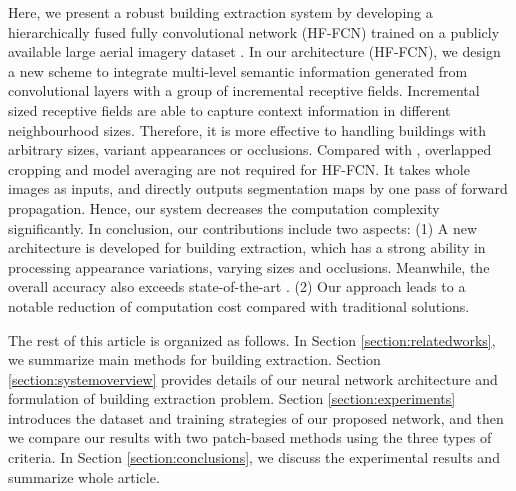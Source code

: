 \documentclass[runningheads]{llncs}
\begin{document}
  Here, we present a robust building extraction system by developing a hierarchically fused fully convolutional network (HF-FCN) trained on a publicly available large aerial imagery dataset \cite{Mnih2013Machine}. In our architecture (HF-FCN), we design a new scheme to integrate multi-level semantic information generated from convolutional layers with a group of incremental receptive fields. Incremental sized receptive fields are able to capture context information in different neighbourhood sizes. Therefore, it is more effective to handling buildings with arbitrary sizes, variant appearances or occlusions. Compared with \cite{Mnih2013Machine,Saito2016Multiple}, overlapped cropping and model averaging are not required for HF-FCN. It takes whole images as inputs, and directly outputs segmentation maps by one pass of forward propagation. Hence, our system decreases the computation complexity significantly. In conclusion, our contributions include two aspects: (1) A new architecture is developed for building extraction, which has a strong ability in processing appearance variations,  varying sizes and occlusions. Meanwhile, the overall accuracy  also exceeds state-of-the-art \cite{Saito2016Multiple}. (2) Our approach leads to a notable reduction of computation cost  compared with traditional solutions.
  
  
   The rest of this article is organized as follows. In Section \ref{section:relatedworks}, we summarize main   methods for building extraction. Section \ref{section:systemoverview} provides details of our neural network architecture and formulation of building extraction problem. Section \ref{section:experiments} introduces the dataset and training strategies of our proposed network, and then we compare our results with two patch-based methods using the three types of criteria. In Section \ref{section:conclusions}, we discuss the experimental results and summarize whole article. 
   
   
\end{document}
